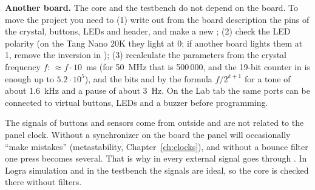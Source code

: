 
\textbf{Another board.} The core and the testbench do not depend on the board. To
move the project you need to (1) write out from the board description the pins of
the crystal, buttons, LEDs and header, and make a new ; (2) check the
LED polarity (on the Tang Nano 20K they light at 0; if another board lights them
at 1, remove the inversion in ); (3) recalculate the parameters
from the crystal frequency $f$:  $\approx f\cdot 10$~ms (for 50~MHz that is
500\,000, and the 19-bit counter in  is enough up to
$5.2\cdot 10^5$), and the bits  and  by the formula
$f/2^{k+1}$ for a tone of about 1.6~kHz and a pause of about 3~Hz. On the Lab tab
the same ports can be connected to virtual buttons, LEDs and a buzzer before
programming.

\begin{warnbox}
The signals of buttons and sensors come from outside and are not related to the
panel clock. Without a synchronizer on the board the panel will occasionally
``make mistakes'' (metastability, Chapter~\ref{ch:clocks}), and without a bounce
filter one press becomes several. That is why in  every external
signal goes through . In Logra simulation and in the testbench
the signals are ideal, so the core is checked there without filters.
\end{warnbox}

